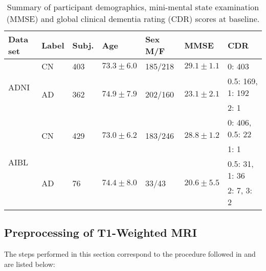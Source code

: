 \documentclass[10pt,journal,compsoc]{IEEEtran}
\begin{document}
\begin{table}[!ht]
\caption{Summary of participant demographics, mini-mental state examination (MMSE) and global clinical dementia rating (CDR) scores at baseline.}
\label{table:population}
\begin{center}
\setlength{\tabcolsep}{3pt}
\scriptsize
\begin{tabular}{l l l l l l l}
\hline
Data set & Label & Subj. & Age & Sex M/F & MMSE & CDR \\
\hline
\multirow{3}{*}{ADNI} & CN & 403 & $73.3\pm6.0$ & 185/218 & $29.1\pm1.1$ & 0: 403 \\ 
& \multirow{2}{*}{AD} & \multirow{2}{*}{362} & \multirow{2}{*}{$74.9\pm7.9$} & \multirow{2}{*}{202/160} & \multirow{2}{*}{$23.1\pm2.1$} & 0.5: 169, 1: 192\\
&&&&&& 2: 1 \\ 
\hline
\multirow{4}{*}{AIBL} & \multirow{2}{*}{CN} & \multirow{2}{*}{429} & \multirow{2}{*}{$73.0\pm6.2$} & \multirow{2}{*}{183/246} & \multirow{2}{*}{$28.8\pm1.2$} & 0: 406, 0.5: 22\\
&&&&&& 1: 1 \\ 
& \multirow{2}{*}{AD} & \multirow{2}{*}{76} & \multirow{2}{*}{$74.4\pm8.0$} & \multirow{2}{*}{33/43} & \multirow{2}{*}{$20.6\pm5.5$} & 0.5: 31, 1: 36\\
&&&&&& 2: 7, 3: 2 \\ 
\hline
\end{tabular}
\end{center}
\end{table}



\subsection{Preprocessing of T1-Weighted MRI}

The steps performed in this section correspond to the procedure followed in \cite{wen_convolutional_2020} and are listed below:
\end{document}
